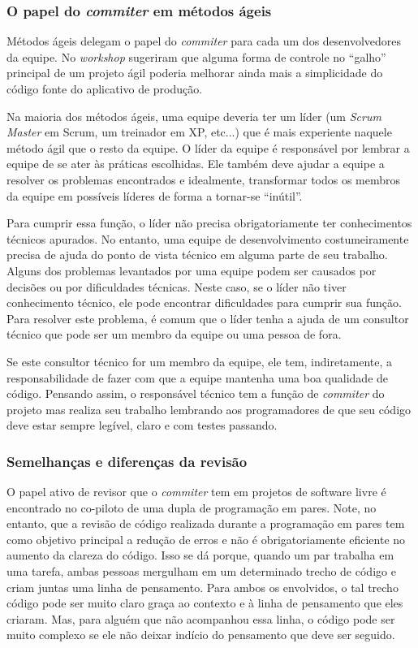 \subsubsection{O papel do \emph{commiter} em métodos ágeis}

Métodos ágeis delegam o papel do \emph{commiter} para cada um dos
desenvolvedores da equipe. No \emph{workshop} sugeriram que alguma
forma de controle no ``galho'' principal de um projeto ágil poderia
melhorar ainda mais a simplicidade do código fonte do aplicativo de
produção.

Na maioria dos métodos ágeis, uma equipe deveria ter um líder (um
\emph{Scrum Master} em Scrum, um treinador em XP, etc...)  que é mais
experiente naquele método ágil que o resto da equipe. O líder da
equipe é responsável por lembrar a equipe de se ater às práticas
escolhidas. Ele também deve ajudar a equipe a resolver os problemas
encontrados e idealmente, transformar todos os membros da equipe em
possíveis líderes de forma a tornar-se ``inútil''.

Para cumprir essa função, o líder não precisa obrigatoriamente ter
conhecimentos técnicos apurados. No entanto, uma equipe de
desenvolvimento costumeiramente precisa de ajuda do ponto de vista
técnico em alguma parte de seu trabalho. Alguns dos problemas
levantados por uma equipe podem ser causados por decisões ou por
dificuldades técnicas. Neste caso, se o líder não tiver conhecimento
técnico, ele pode encontrar dificuldades para cumprir sua função. Para
resolver este problema, é comum que o líder tenha a ajuda de um
consultor técnico que pode ser um membro da equipe ou uma pessoa de
fora.

Se este consultor técnico for um membro da equipe, ele tem,
indiretamente, a responsabilidade de fazer com que a equipe mantenha
uma boa qualidade de código. Pensando assim, o responsável técnico tem
a função de \emph{commiter} do projeto mas realiza seu trabalho
lembrando aos programadores de que seu código deve estar sempre
legível, claro e com testes passando.

\subsubsection{Semelhanças e diferenças da revisão}

O papel ativo de revisor que o \emph{commiter} tem em projetos de
software livre é encontrado no co-piloto de uma dupla de programação
em pares. Note, no entanto, que a revisão de código realizada durante
a programação em pares tem como objetivo principal a redução de erros
e não é obrigatoriamente eficiente no aumento da clareza do
código. Isso se dá porque, quando um par trabalha em uma tarefa, ambas
pessoas mergulham em um determinado trecho de código e criam juntas
uma linha de pensamento. Para ambos os envolvidos, o tal trecho código
pode ser muito claro graça ao contexto e à linha de pensamento que
eles criaram. Mas, para alguém que não acompanhou essa linha, o código
pode ser muito complexo se ele não deixar indício do pensamento que
deve ser seguido.

